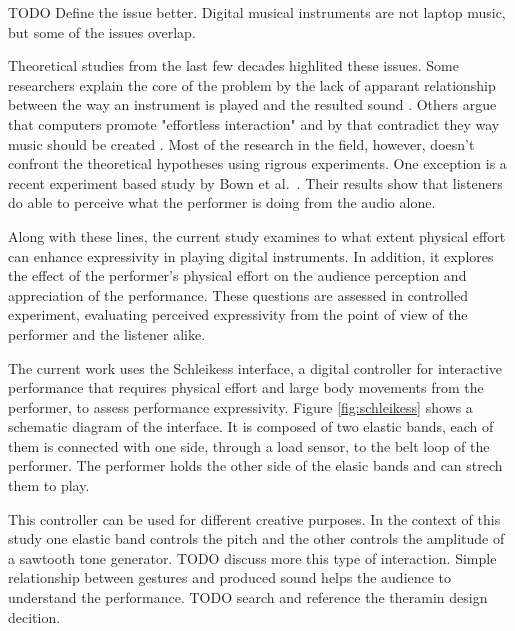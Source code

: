\documentclass{sigchi}
\begin{document}
TODO Define the issue better. Digital musical instruments are not laptop music, but some of the issues overlap.

Theoretical studies from the last few decades highlited these issues.
Some researchers explain the core of the problem by the lack of apparant relationship between the way an instrument is played and the resulted sound \cite{Schloss2003,DEscrivan2006}.
Others argue that computers promote "effortless interaction" and by that contradict they way music should be created \cite{Ryan1992}.
Most of the research in the field, however, doesn't confront the theoretical hypotheses using rigrous experiments.
One exception is a recent experiment based study by Bown et al.\ \cite{Bown2014}.
Their results show that listeners do able to perceive what the performer is doing from the audio alone.

Along with these lines, the current study examines to what extent physical effort can enhance expressivity in playing digital instruments.
In addition, it explores the effect of the performer's physical effort on the audience perception and appreciation of the performance.
These questions are assessed in controlled experiment, evaluating perceived expressivity from the point of view of the performer and the listener alike.

The current work uses the Schleikess interface, a digital controller for interactive performance that requires physical effort and large body movements from the performer, to assess performance expressivity.
Figure \ref{fig:schleikess} shows a schematic diagram of the interface.
It is composed of two elastic bands, each of them is connected with one side, through a load sensor, to the belt loop of the performer.
The performer holds the other side of the elasic bands and can strech them to play.

This controller can be used for different creative purposes.
In the context of this study one elastic band controls the pitch and the other controls the amplitude of a sawtooth tone generator.
TODO discuss more this type of interaction. Simple relationship between gestures and produced sound helps the audience to understand the performance. TODO search and reference the theramin design decition.
\end{document}
